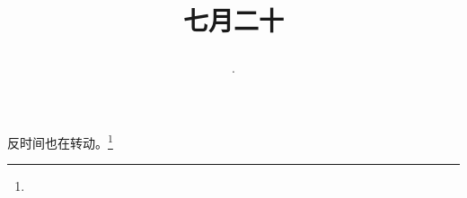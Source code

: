 \title{\date[d=23,m=8,y=2024][year:cn-y,年,month:cn,day:cn,日,·,weekday]·七月二十 }
反时间也在转动。\footnote{ }

